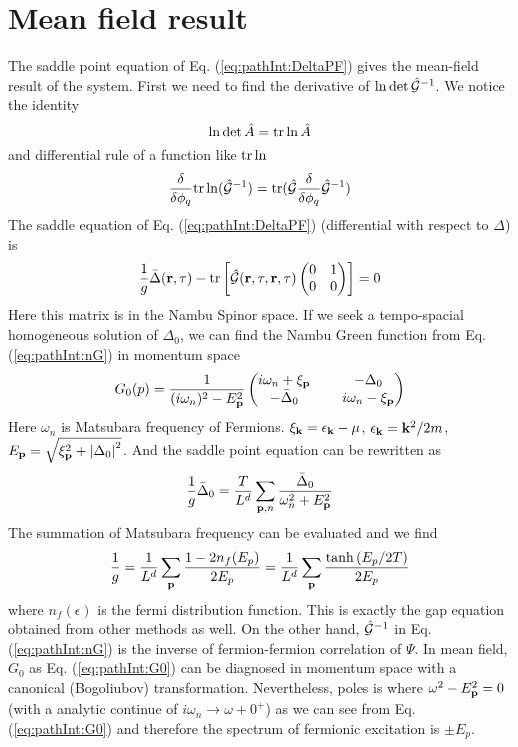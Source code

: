 \section{Mean field result\label{sec:pathInt:meanfield}}
The saddle point equation of Eq. (\ref{eq:pathInt:DeltaPF}) gives the mean-field result of the system.  First we need to find the derivative of $\ln\det\hat{\mathcal{G}}^{-1}$.  We notice the identity
\begin{equation}
\ln\det\hat{A}=\text{tr}\ln\hat{A}
\end{equation}
and differential rule of a function like $\text{tr}\ln$
\begin{equation}\label{eq:pathInt:diffTr}
\frac{\delta}{\delta\phi_q}\text{tr}\ln(\hat{\mathcal{G}}^{-1})=\text{tr}(\hat{\mathcal{G}}\frac{\delta}{\delta\phi_q}\hat{\mathcal{G}}^{-1})
\end{equation}
The saddle equation of Eq. (\ref{eq:pathInt:DeltaPF}) (differential with respect to $\Delta$) is
\begin{equation}
\frac{1}{g}\bar{\Delta}(\mathbf{r},\tau)-\text{tr}\left[\hat{\mathcal{G}}(\mathbf{r},\tau,\mathbf{r},\tau)\begin{pmatrix}0&1\\0&0\end{pmatrix}\right]=0
\end{equation}
Here this matrix is in the Nambu Spinor space.  If we seek a tempo-spacial homogeneous solution of $\Delta_0$, we can find the Nambu Green function from Eq. (\ref{eq:pathInt:nG}) in momentum space
\begin{equation}\label{eq:pathInt:G0}
G_0(p)=\frac{1}{(i\omega_n)^2-E_{\mathbf{p}}^2}
\begin{pmatrix}
	i\omega_n+\xi_{\mathbf{p}}&\;&-\Delta_0\\
	-\bar{\Delta}_0&\;&i\omega_n-\xi_{\mathbf{p}}
\end{pmatrix}
\end{equation}
Here $\omega_n$ is Matsubara frequency of Fermions.  $\xi_{\mathbf{k}}=\epsilon_{\mathbf{k}}-\mu$, $\epsilon_{\mathbf{k}}=\mathbf{k}^{2}/2m$,  $E_{\mathbf{p}}=\sqrt{\xi_{\mathbf{p}}^2+\left\lvert{\Delta_0}\right\rvert^2}$.  And the saddle point equation can be rewritten as 
\begin{equation}
\frac{1}{g}\bar{\Delta}_0=\frac{T}{L^d}\sum_{\mathbf{p},n}\frac{\bar\Delta_0}{\omega_n^2+E_{\mathbf{p}}^2}
\end{equation}
The summation of Matsubara frequency can be evaluated and we find 
\begin{equation}
\frac{1}{g}=\frac{1}{L^d}\sum_{\mathbf{p}}\frac{1-2n_f(E_p)}{2E_p}=\frac{1}{L^d}\sum_{\mathbf{p}}\frac{\tanh{(E_p/2T)}}{2E_p}
\label{eq:pathInt:gap}
\end{equation}
where $n_f(\epsilon)$ is the fermi distribution function.  This is exactly the gap equation obtained from other methods as well.  On the other hand, $\hat{\mathcal{G}}^{-1}$ in Eq. (\ref{eq:pathInt:nG})  is the inverse of fermion-fermion correlation of $\Psi$.  In mean field, $G_{0}$ as Eq. (\ref{eq:pathInt:G0}) can be diagnosed in momentum space with a canonical (Bogoliubov) transformation.  Nevertheless, poles is where  $\omega^2-E_{\mathbf{p}}^2=0$ (with a analytic continue of $i\omega_{n}\rightarrow\omega+0^{+}$) as we can see from  Eq. (\ref{eq:pathInt:G0}) and therefore the spectrum of fermionic excitation is $\pm{}E_{p}$.  \

